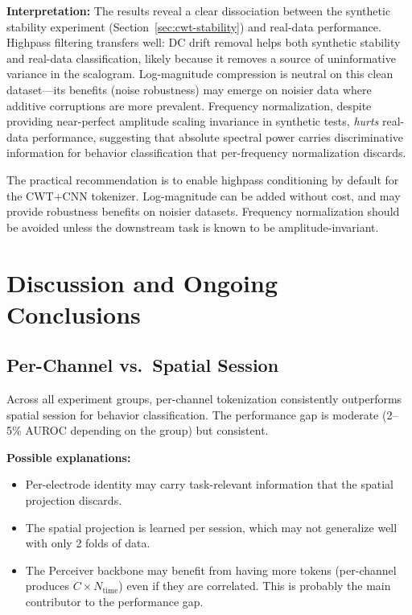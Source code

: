 \documentclass[11pt, a4paper]{article}
\begin{document}
\textbf{Interpretation:} The results reveal a clear dissociation
between the synthetic stability experiment
(Section~\ref{sec:cwt-stability}) and real-data performance.  Highpass
filtering transfers well: DC drift removal helps both synthetic
stability and real-data classification, likely because it removes a
source of uninformative variance in the scalogram.  Log-magnitude
compression is neutral on this clean dataset---its benefits (noise
robustness) may emerge on noisier data where additive corruptions are
more prevalent.  Frequency normalization, despite providing
near-perfect amplitude scaling invariance in synthetic tests,
\emph{hurts} real-data performance, suggesting that absolute spectral
power carries discriminative information for behavior classification
that per-frequency normalization discards.

The practical recommendation is to enable highpass conditioning
by default for the CWT+CNN tokenizer.  Log-magnitude can be added
without cost, and may provide robustness benefits on noisier
datasets.  Frequency normalization should be avoided unless the
downstream task is known to be amplitude-invariant.


\section{Discussion and Ongoing Conclusions}
\label{sec:discussion}

\subsection{Per-Channel vs.\ Spatial Session}

Across all experiment groups, per-channel tokenization consistently
outperforms spatial session for behavior classification. The performance
gap is moderate (2--5\% AUROC depending on the group) but consistent.

\textbf{Possible explanations:}
\begin{itemize}[nosep]
      \item Per-electrode identity may carry task-relevant information
            that the spatial projection discards.
      \item The spatial projection is learned per session, which may not
            generalize well with only 2 folds of data.
      \item The Perceiver backbone may benefit from having more tokens
            (per-channel produces $C \times N_\text{time}$) even if they
            are correlated. This is probably the main contributor to the performance gap.
\end{itemize}
\end{document}
